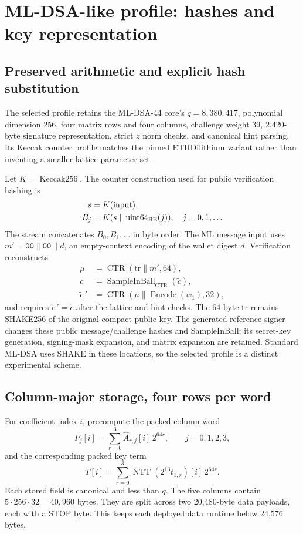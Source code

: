 \documentclass[11pt,a4paper]{article}
\newcommand{\K}{\operatorname{Keccak256}}
\newcommand{\CTR}{\operatorname{CTR}}
\newcommand{\NTT}{\operatorname{NTT}}
\begin{document}
\newpage
\section{ML-DSA-like profile: hashes and key representation}
\subsection{Preserved arithmetic and explicit hash substitution}
The selected profile retains the ML-DSA-44 core's $q=8{,}380{,}417$, polynomial
dimension 256, four matrix rows and four columns, challenge weight 39,
2,420-byte signature representation, strict $z$ norm checks, and canonical
hint parsing. Its Keccak counter profile matches the pinned ETHDilithium
variant rather than inventing a smaller lattice parameter set.

Let $K=\K$. The counter construction used for public verification hashing is
\begin{align}
 s &= K(\mathrm{input}),\\
 B_j &= K(s\parallel\operatorname{uint64}_{\rm BE}(j)),\quad j=0,1,\ldots
\end{align}
The stream concatenates $B_0,B_1,\ldots$ in byte order. The ML message input
uses $m'=\texttt{00}\parallel\texttt{00}\parallel d$, an empty-context
encoding of the wallet digest $d$. Verification reconstructs
\begin{align}
 \mu &= \CTR(\mathrm{tr}\parallel m',64),\\
 c &= \operatorname{SampleInBall}_{\CTR}(\widetilde c),\\
 \widetilde c\,' &= \CTR(\mu\parallel\operatorname{Encode}(w_1),32),
\end{align}
and requires $\widetilde c\,'=\widetilde c$ after the lattice and hint checks.
The 64-byte $\mathrm{tr}$ remains SHAKE256 of the original compact public key.
The generated reference signer changes these public message/challenge
hashes and SampleInBall; its secret-key generation, signing-mask expansion,
and matrix expansion are retained. Standard ML-DSA uses SHAKE in these
locations, so the selected profile is a distinct experimental scheme.

\subsection{Column-major storage, four rows per word}
For coefficient index $i$, precompute the packed column word
\begin{equation}
 P_j[i]=\sum_{r=0}^{3}\widehat A_{r,j}[i]\,2^{64r},\qquad j=0,1,2,3,
\end{equation}
and the corresponding packed key term
\begin{equation}
 T[i]=\sum_{r=0}^{3}\NTT(2^{13}t_{1,r})[i]\,2^{64r}.
\end{equation}
Each stored field is canonical and less than $q$. The five columns contain
$5\cdot256\cdot32=40{,}960$ bytes. They are split across two 20,480-byte
data payloads, each with a STOP byte. This keeps each deployed data runtime
below 24,576 bytes.
\end{document}
